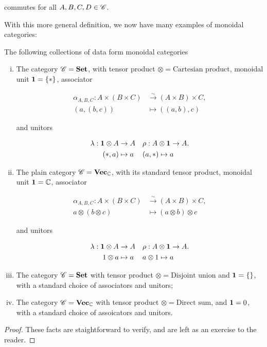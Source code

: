 \begin{definition}
\begin{enumerate}
commutes for all $A,B,C,D\in \mathscr{C}$.
\end{enumerate}

\raggedleft\qedsymbol{}
\end{definition}

With this more general definition, we now have many examples of monoidal categories:

\begin{proposition} The following collections of data form monoidal categories

\begin{enumerate}[(i)]
\item The category $\mathscr{C}=\mathbf{Set}$, with tensor product $\otimes = \text{Cartesian product}$, monoidal unit $\mathbf{1} =\{*\}$, associator

\begin{align*}
\alpha_{A,B,C}: A\times (B\times C) &\xrightarrow{\sim}(A\times B)\times C,\\
(a,(b,c))&\mapsto ((a,b),c)
\end{align*}

and unitors 

\begin{align*}
\lambda: \mathbf{1} \otimes A &\to A && \rho:  A\otimes \mathbf{1} \to A.\\
(*, a)&\mapsto a && (a,*)\mapsto a
\end{align*}

\item The plain category $\mathscr{C}=\mathbf{Vec}_{\mathbb{C}}$, with its standard tensor product, monoidal unit $\mathbf{1} =\mathbb{C}$, associator

\begin{align*}
\alpha_{A,B,C}: A\times (B\times C) &\xrightarrow{\sim}(A\times B)\times C,\\
a\otimes (b\otimes c ) & \mapsto (a\otimes b)\otimes c
\end{align*}

and unitors 

\begin{align*}
\lambda: \mathbf{1} \otimes A &\to A && \rho:  A\otimes \mathbf{1} \to A.\\
1\otimes a &\mapsto  a && a\otimes 1 \mapsto a
\end{align*}

\item The category $\mathscr{C}=\mathbf{Set}$ with tensor product $\otimes=\text{Disjoint union}$ and $\mathbf{1}=\{\}$, with a standard choice of associators and unitors;

\item The category $\mathscr{C}=\mathbf{Vec}_{\mathbb{C}}$ with tensor product $\otimes = \text{Direct sum}$, and $\mathbf{1} = 0$, with a standard choice of assoicators and unitors.
\end{enumerate}


\end{proposition}
\begin{proof} These facts are staightforward to verify, and are left as an exercise to the reader.
\end{proof}

